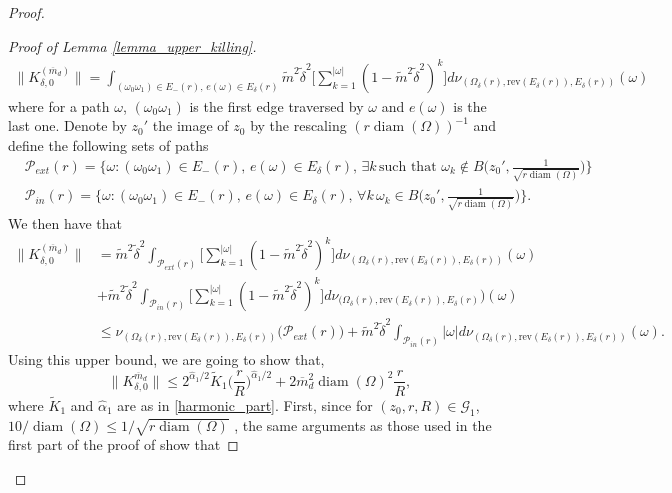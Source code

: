 \documentclass{article}
\theoremstyle{definition}
\theoremstyle{remark}
\theoremstyle{remark}
\begin{document}
\begin{proof}
\begin{proof}[Proof of Lemma \ref{lemma_upper_killing}]
\begin{align*}
    \| K_{\delta, 0}^{(\overline{m}_d)} \| = \int_{(\omega_{0}\omega_{1}) \in E_{-}(r), \, e(\omega) \in E_{\delta}(r)} \tilde {m}^{2} \tilde \delta^2 \bigg[ \sum_{k=1}^{\vert \omega \vert } (1-\tilde{m}^2 \tilde \delta^2)^k \bigg] d\nu_{(\Omega_{\delta}(r), \text{rev}(E_{\delta}(r)), E_{\delta}(r))}(\omega)
\end{align*}
where for a path $\omega$, $(\omega_0\omega_1)$ is the first edge traversed by $\omega$ and $e(\omega)$ is the last one. Denote by $z_0'$ the image of $z_0$ by the rescaling $(r\operatorname{diam}(\Omega))^{-1}$ and define the following sets of paths
\begin{align*}
    &\mathcal{P}_{ext}(r) = \bigg \{\omega: (\omega_0\omega_1) \in E_{-}(r), \, e(\omega) \in E_{\delta}(r), \, \exists k \, \text{such that } \omega_{k} \notin B\big(z_0', \frac{1}{\sqrt{r\operatorname{diam}(\Omega)}} \big) \bigg \} \\
    &\mathcal{P}_{in}(r) = \bigg \{\omega: (\omega_0\omega_1) \in E_{-}(r), \, e(\omega) \in E_{\delta}(r), \, \forall k \, \omega_{k} \in B \big(z_0', \frac{1}{\sqrt{r\operatorname{diam}(\Omega)}} \big) \bigg \}.
\end{align*}
We then have that
\begin{align} \label{ineq_K0}
    \| K_{\delta, 0}^{(\overline{m}_d)} \| &= \tilde m^2 \tilde \delta^2 \int_{\mathcal{P}_{ext}(r)} \bigg[ \sum_{k=1}^{\vert \omega \vert } (1-\tilde{m}^2 \tilde \delta^2)^k \bigg] d\nu_{(\Omega_{\delta}(r), \text{rev}(E_{\delta}(r)), E_{\delta}(r))}(\omega) \nonumber \\
    &+ \tilde m^2 \tilde \delta^2 \int_{\mathcal{P}_{in}(r)} \bigg[ \sum_{k=1}^{\vert \omega \vert } (1-\tilde{m}^2 \tilde \delta^2)^k \bigg] d\nu_{(\Omega_{\delta}(r), \text{rev}(E_{\delta}(r)), E_{\delta}(r)})(\omega) \nonumber \\
    &\leq \nu_{(\Omega_{\delta}(r), \text{rev}(E_{\delta}(r)), E_{\delta}(r))}\big( \mathcal{P}_{ext}(r) \big) + \tilde m^2 \tilde \delta^2 \int_{\mathcal{P}_{in}(r)} \vert \omega \vert d\nu_{(\Omega_{\delta}(r), \text{rev}(E_{\delta}(r)), E_{\delta}(r))}(\omega).
\end{align}
Using this upper bound, we are going to show that,
\begin{equation*}
    \| K_{\delta, 0}^{\overline{m}_d} \| \leq 2^{\hat \alpha_1 /2} \tilde K_1 \bigg( \frac{r}{R}\bigg)^{\hat \alpha_1 /2} + 2\overline{m}_d^2\operatorname{diam}(\Omega)^2 \frac{r}{R},
\end{equation*}
where $\tilde K_1$ and $\hat \alpha_1$ are as in \eqref{harmonic_part}. First, since for $(z_0,r,R) \in \mathcal{G}_1$, $10/\operatorname{diam}(\Omega) \leq 1/\sqrt{r\operatorname{diam}(\Omega)}$ , the same arguments as those used in the first part of the proof of \cite[Proposition~6.3]{HE} show that

\end{proof}
\end{proof}
\end{document}
